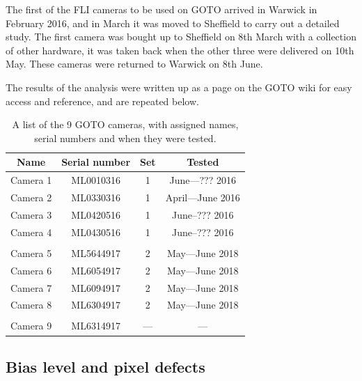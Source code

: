 \begin{colsection}
\begin{colsection}
\clearpage

The first of the FLI cameras to be used on GOTO arrived in Warwick in February 2016, and in March it was moved to Sheffield to carry out a detailed study.
The first camera was bought up to Sheffield on 8th March with a collection of other hardware, it was taken back when the other three were delivered on 10th May. These cameras were returned to Warwick on 8th June.

The results of the analysis were written up as a page on the GOTO wiki for easy access and reference, and are repeated below.

\begin{table}[t]
    \begin{center}
        \begin{tabular}{cccc} %
            Name     & Serial number & Set & Tested     \\
            \midrule
            Camera 1 & ML0010316     & 1   & June---??? 2016 \\
            Camera 2 & ML0330316     & 1   & April---June 2016 \\
            Camera 3 & ML0420516     & 1   & June--??? 2016 \\
            Camera 4 & ML0430516     & 1   & June--??? 2016 \\
            \\
            Camera 5 & ML5644917     & 2   & May---June 2018 \\
            Camera 6 & ML6054917     & 2   & May---June 2018 \\
            Camera 7 & ML6094917     & 2   & May---June 2018 \\
            Camera 8 & ML6304917     & 2   & May---June 2018 \\
            \\
            Camera 9 & ML6314917     & --- & --- \\
        \end{tabular}
    \end{center}
    \caption[List of GOTO cameras]{
        A list of the 9 GOTO cameras, with assigned names, serial numbers and when they were tested.
        }\label{tab:cameras}
\end{table}

\end{colsection}

\newpage
\subsection{Bias level and pixel defects}
\label{sec:bias}
\begin{colsection}


\end{colsection}
\end{colsection}
